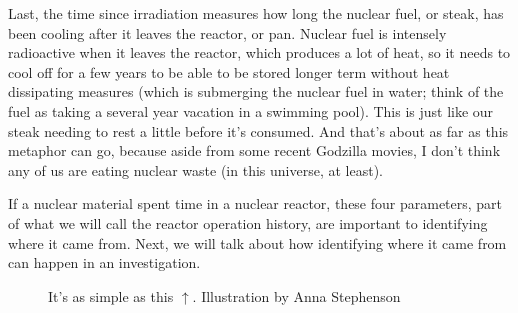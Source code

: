 {Last, the time since irradiation measures how long the nuclear fuel, or steak,
has been cooling after it leaves the reactor, or pan. Nuclear fuel is intensely
radioactive when it leaves the reactor, which produces a lot of heat, so it
needs to cool off for a few years to be able to be stored longer term without
heat dissipating measures (which is submerging the nuclear fuel in water; think
of the fuel as taking a several year vacation in a swimming pool). This is just
like our steak needing to rest a little before it's consumed. And that's about
as far as this metaphor can go, because aside from some recent Godzilla movies,
I don't think any of us are eating nuclear waste (in this universe, at least). 

If a nuclear material spent time in a nuclear reactor, these four parameters,
part of what we will call the reactor operation history, are important to
identifying where it came from. Next, we will talk about how identifying
where it came from can happen in an investigation.

\begin{figure}[H]
  \centering
  \large It's as simple as this $\uparrow$. \small Illustration by Anna Stephenson
\end{figure}

}
